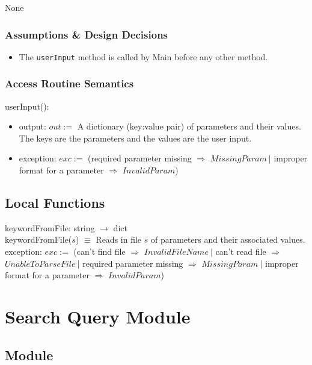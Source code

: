 \documentclass{article}
\begin{document}
None

\subsubsection* {Assumptions \& Design Decisions}

\begin{itemize}
\item The \texttt{userInput} method is called by Main before any other method.
\end{itemize}

\subsubsection* {Access Routine Semantics}

\noindent userInput():
\begin{itemize}
\item output: $\mathit{out} :=$ A dictionary (key:value pair) of parameters and their values. The keys are the parameters and the values are the user input.
\item exception: $\mathit{exc} :=$ (required parameter missing $\Rightarrow$ $\mathit{MissingParam} ~\vert$ improper format for a parameter $\Rightarrow$ $\mathit{InvalidParam}$)
\end{itemize}

\subsection* {Local Functions}

keywordFromFile: string $\rightarrow$ dict \\
keywordFromFile($\mathit{s}$) $\equiv$ Reads in file $\mathit{s}$ of parameters and their associated values.\\
exception: $exc :=$ (can't find file $\Rightarrow$ $\mathit{InvalidFileName} ~\vert$ can't read file $\Rightarrow$ $\mathit{UnableToParseFile} ~\vert$ required parameter missing $\Rightarrow$ $\mathit{MissingParam} ~\vert$ improper format for a parameter $\Rightarrow$ $\mathit{InvalidParam}$)

\newpage

\section*{Search Query Module}

\subsection* {Module}
\end{document}
